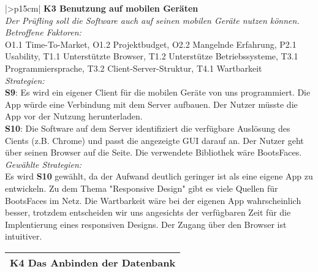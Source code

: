 {%
\begin{center}
\begin{minipage}{\linewidth}
    \centering
\renewcommand{\arraystretch}{1.5}
\begin{tabular}{|>{\centering\arraybackslash}p{15cm}|}
            \hline
           \textbf{K3 Benutzung auf mobilen Geräten}\\ \hline
            \label{K3}
            \textit{Der Prüfling soll die Software auch auf seinen mobilen Geräte nutzen können.}\\ \hline
            \textit{Betroffene Faktoren:} \\ 
	  O1.1 Time-To-Market, O1.2 Projektbudget, O2.2 Mangelnde Erfahrung, P2.1 Usability, T1.1 Unterstützte Browser, T1.2 Unterstütze Betriebssysteme, T3.1 Programmiersprache, T3.2 Client-Server-Struktur, T4.1 Wartbarkeit
	\\ \hline
	      \textit{Strategien:} \\ 
	\textbf{S9}: Es wird ein eigener Client für die mobilen Geräte von uns programmiert. Die App würde eine Verbindung mit dem Server aufbauen. Der Nutzer müsste die App vor der Nutzung herunterladen.\\ 
	\textbf{S10}: Die Software auf dem Server identifiziert die verfügbare Auslösung des Cients (z.B. Chrome) und passt die angezeigte GUI darauf an. Der Nutzer geht über seinen Browser auf die Seite. Die verwendete Bibliothek wäre BootsFaces.
\\ \hline
	      \textit{Gewählte Strategien:} \\
Es wird \textbf{S10} gewählt, da der Aufwand deutlich geringer ist als eine eigene App zu entwickeln. Zu dem Thema "Responsive Design" gibt es viele Quellen für BootsFaces  im Netz. Die Wartbarkeit wäre bei der eigenen App wahrscheinlich besser, trotzdem entscheiden wir uns
angesichts der verfügbaren Zeit für die Implentierung eines responsiven Designs. Der Zugang über den Browser ist intuitiver.
\\ \hline
        \end{tabular}
\end{minipage}
\end{center}
\begin{center}
\begin{minipage}{\linewidth}
    \centering
\renewcommand{\arraystretch}{1.5}
\begin{tabular}{|>{\centering\arraybackslash}p{15cm}|}
            \hline
           \textbf{K4 Das Anbinden der Datenbank}\\ \hline

\end{tabular}
\end{minipage}
\end{center}}
